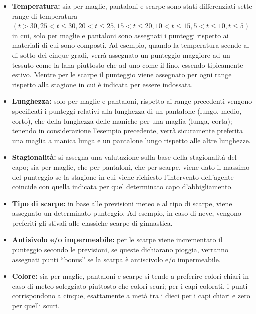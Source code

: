 \documentclass[a4paper, 11pt, oneside]{report}
\begin{document}
            \begin{itemize}
                \item \textbf{Temperatura:} sia per maglie, pantaloni e scarpe sono stati differenziati sette range di temperatura
                $(t>30, 25<t\leq 30, 20<t\leq 25, 15<t\leq 20, 10<t\leq 15, 5<t\leq 10, t\leq 5)$ in cui,
                solo per maglie e pantaloni sono assegnati i punteggi rispetto ai materiali di cui sono composti.
                Ad esempio, quando la temperatura scende al di sotto dei cinque gradi, verrà assegnato un punteggio maggiore ad un tessuto
                come la lana piuttosto che ad uno come il lino, essendo tipicamente estivo.
                Mentre per le scarpe il punteggio viene assegnato per ogni range rispetto alla stagione in cui è indicata per essere
                indossata.
                \item \textbf{Lunghezza:} solo per maglie e pantaloni, rispetto ai range precedenti vengono specificati i punteggi relativi
                alla lunghezza di un pantalone (lungo, medio, corto), che della lunghezza delle maniche per una maglia (lunga, corta);
                tenendo in considerazione l'esempio precedente, verrà sicuramente preferita una maglia a manica lunga e un pantalone
                lungo rispetto alle altre lunghezze.
                \item \textbf{Stagionalità:} si assegna una valutazione sulla base della stagionalità del capo; sia per maglie, che per
                pantaloni, che per scarpe, viene dato il massimo del punteggio se la stagione in cui viene richiesto l'intervento dell'agente coincide
                con quella indicata per quel determinato capo d'abbigliamento.
                \item \textbf{Tipo di scarpe:} in base alle previsioni meteo e al tipo di scarpe, viene assegnato un determinato punteggio.
                Ad esempio, in caso di neve, vengono preferiti gli stivali alle classiche scarpe di ginnastica.
                \item \textbf{Antisivolo e/o impermeabile:} per le scarpe viene incrementato il
                punteggio secondo le previsioni, se queste dichiarano pioggia, verranno assegnati punti ``bonus'' se la
                scarpa è antiscivolo e/o impermeabile.
                \item \textbf{Colore:} sia per maglie, pantaloni e scarpe si tende a preferire colori chiari in caso di meteo
                soleggiato piuttosto che colori scuri; per i capi colorati, i punti corrispondono a cinque, esattamente a
                metà tra i dieci per i capi chiari e zero per quelli scuri.
            \end{itemize}
\end{document}
